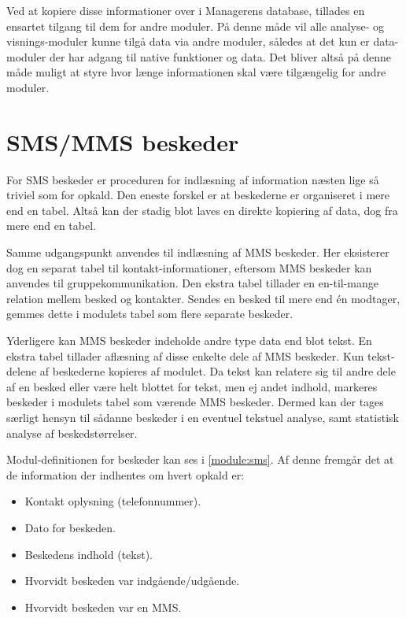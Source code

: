 Ved at kopiere disse informationer over i Managerens database, tillades en ensartet tilgang til dem for andre moduler.
På denne måde vil alle analyse- og visnings-moduler kunne tilgå data via andre moduler, således at det kun er data-moduler der har adgang til native funktioner og data.
Det bliver altså på denne måde muligt at styre hvor længe informationen skal være tilgængelig for andre moduler.



\section{SMS/MMS beskeder}\label{implementerede_moduler:smsmms}
For SMS beskeder er proceduren for indlæsning af information næsten lige så triviel som for opkald.
Den eneste forskel er at beskederne er organiseret i mere end en tabel.
Altså kan der stadig blot laves en direkte kopiering af data, dog fra mere end en tabel.

Samme udgangspunkt anvendes til indlæsning af MMS beskeder.
Her eksisterer dog en separat tabel til kontakt-informationer, eftersom MMS beskeder kan anvendes til gruppekommunikation.
Den ekstra tabel tillader en en-til-mange relation mellem besked og kontakter.
Sendes en besked til mere end én modtager, gemmes dette i modulets tabel som flere separate beskeder.

Yderligere kan MMS beskeder indeholde andre type data end blot tekst.
En ekstra tabel tillader aflæsning af disse enkelte dele af MMS beskeder.
Kun tekst-delene af beskederne kopieres af modulet.
Da tekst kan relatere sig til andre dele af en besked eller være helt blottet for tekst, men ej andet indhold, markeres beskeder i modulets tabel som værende MMS beskeder.
Dermed kan der tages særligt hensyn til sådanne beskeder i en eventuel tekstuel analyse, samt statistisk analyse af beskedstørrelser.

Modul-definitionen for beskeder kan ses i \cref{module:sms}.
Af denne fremgår det at de information der indhentes om hvert opkald er:
\begin{itemize}
\item Kontakt oplysning (telefonnummer).
\item Dato for beskeden.
\item Beskedens indhold (tekst).
\item Hvorvidt beskeden var indgående/udgående.
\item Hvorvidt beskeden var en MMS.
\end{itemize}


